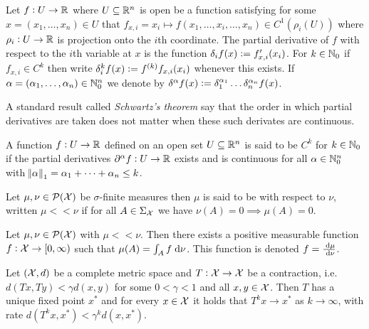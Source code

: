 \begin{defn}
  Let $f : U \to \mathbb{R}$ where $U \subseteq \mathbb{R}^n$ 
  is open be a function
  satisfying for some $x = (x_1, \dots, x_n) \in U$ that
  $f_{x, i} = x_i \mapsto f(x_1, \dots, x_i, \dots, x_n) \in C^1(\rho_i(U))$
  where $\rho_i : U \to \mathbb{R}$ is projection onto the $i$th coordinate.
  The partial derivative of $f$ with respect to the $i$th variable at $x$ is the
  function $\delta_i f(x) \vcentcolon= f_{x, i}'(x_i)$.
  For $k \in \mathbb{N}_0$
  if $f_{x, i} \in C^k$ then write
  $\delta_i^k f(x) \vcentcolon= f^{(k)} f_{x, i} (x_i)$ whenever this exists.
  If $\alpha = (\alpha_1, \dots, \alpha_n) \in \mathbb{N}_0^n$ we denote by
  $\delta^\alpha f(x) \vcentcolon= \delta_1^{\alpha_1} \dots \delta_n^{\alpha_n} f(x)$.
  \label{defn:partialDer}
\end{defn}
\begin{rem}
  A standard result called \emph{Schwartz's theorem} say that the order
  in which partial derivatives are taken does not matter when
  these such derivates are continuous.
\end{rem}

\begin{defn}[Differentiability in $\R^n$]
  A function $f: U \to \mathbb{R}$ defined on an open set $U \subseteq \mathbb{R}^n$
  is said to be $C^k$ for $k \in \mathbb{N}_0$ if
  the partial derivatives
  $\partial^\alpha f : U \to \mathbb{R}$ exists and is continuous for all
  $\alpha \in \mathbb{N}_0^n$ with $\norm{\alpha}_1 = \alpha_1 + \dots + \alpha_n \leq k$.
  \label{defn:diffRn}
\end{defn}

\begin{defn}
  Let $\mu, \nu \in \mathcal{P}(\mathcal{X})$ be $\sigma$-finite measures
  then $\mu$ is said to be  with respect to 
  $\nu$, written $\mu << \nu$ if for all $A \in \Sigma_\mathcal{X}$ we have
  $\nu(A)=0 \implies \mu(A)=0$.
  \label{defn:absContMeas}
\end{defn}

\begin{thm}
  Let $\mu, \nu \in \mathcal{P}(\mathcal{X})$ with $\mu << \nu$.
  Then there exists a positive measurable function
  $f : \mathcal{X} \to [0, \infty)$
  such that $\mu(A) = \int_A f \; \mathrm{d} \nu$.
  This function is denoted $f = \frac{\; \mathrm{d} \mu}{\; \mathrm{d} \nu}$.
  \label{thm:radonNiko}
\end{thm}

\begin{thm}
  Let $(\mathcal{X}, d)$ be a complete metric space
  and $T:\mathcal{X} \to \mathcal{X}$ be a contraction,
  i.e. $d(Tx, Ty)<\gamma d(x, y)$ for some $0 < \gamma < 1$
  and all $x,y \in \mathcal{X}$.
  Then $T$ has a unique fixed point $x^*$ and for every $x\in \mathcal{X}$
  it holds that $T^k x \to x^*$ as $k \to \infty$, with rate
  $d(T^k x, x^*) < \gamma^k d(x, x^*)$.
  \label{thm:BanachFP}
\end{thm}



